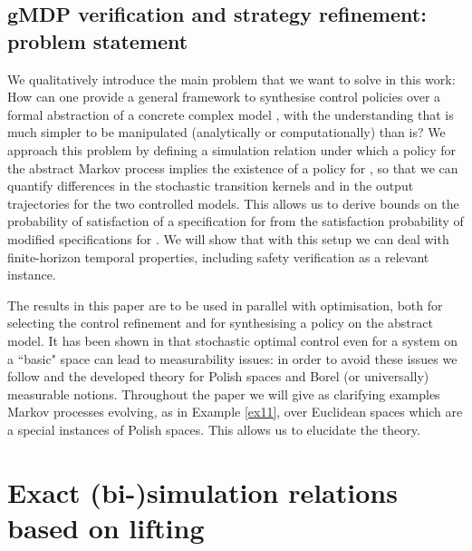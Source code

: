 \documentclass[letterpaper, 10 pt, conference]{amsart}
\theoremstyle{definition}
\theoremstyle{example}
\theoremstyle{remark}
\begin{document}
\subsection{gMDP verification and strategy refinement: problem statement} 
We qualitatively introduce the main problem that we want to solve in this work: 
How can one provide a general framework to synthesise control policies over a formal abstraction  of a concrete complex model ,  
with the understanding that  is much simpler to be manipulated (analytically or computationally) than  is? 
We approach this problem by defining a simulation relation under which a policy  
for the abstract Markov process  implies the existence of a policy   for , 
so that we can quantify differences in the stochastic transition kernels and in the output trajectories for the two controlled models.  
This allows us to derive bounds on the probability of satisfaction of a specification for  from 
the satisfaction probability of modified specifications for . We will show that with this setup we can deal with finite-horizon temporal properties, including safety verification as a relevant instance.   


The  results in this paper are to be used in parallel with optimisation, 
 both for selecting the control refinement and for synthesising a policy on the abstract model. It has been shown in \cite{bible} that stochastic optimal control  even for a system on a ``basic"  space can lead to measurability issues: 
in order to avoid these issues we follow \cite{bible,Desharnais2008} and the developed theory for Polish spaces and Borel (or universally) measurable notions.  Throughout the paper we will give as clarifying examples Markov processes evolving, as in Example \ref{ex11}, over Euclidean spaces which are a special instances of Polish spaces. 
 This allows us to elucidate the theory. 
 
\section{Exact (bi-)simulation relations based on lifting}\label{sec:exact}
\end{document}
